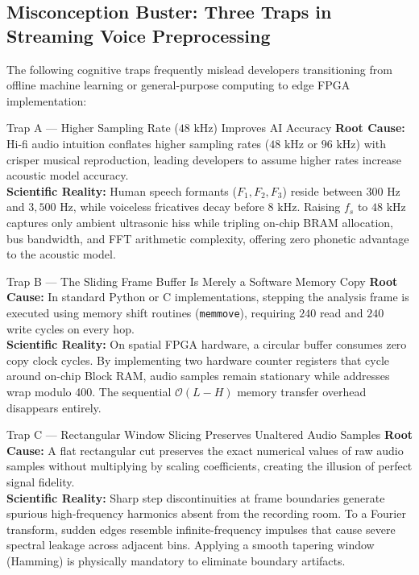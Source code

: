 \documentclass[11pt,a4paper]{article}
\begin{document}
\subsection*{Misconception Buster: Three Traps in Streaming Voice Preprocessing}

The following cognitive traps frequently mislead developers transitioning from offline machine learning or general-purpose computing to edge FPGA implementation:

\begin{misconceptionbox}{Trap A --- Higher Sampling Rate ($48\text{ kHz}$) Improves AI Accuracy}
\textbf{Root Cause:} Hi-fi audio intuition conflates higher sampling rates ($48\text{ kHz}$ or $96\text{ kHz}$) with crisper musical reproduction, leading developers to assume higher rates increase acoustic model accuracy.\\[1mm]
\textbf{Scientific Reality:} Human speech formants ($F_1, F_2, F_3$) reside between $300\text{ Hz}$ and $3{,}500\text{ Hz}$, while voiceless fricatives decay before $8\text{ kHz}$. Raising $f_s$ to $48\text{ kHz}$ captures only ambient ultrasonic hiss while tripling on-chip BRAM allocation, bus bandwidth, and FFT arithmetic complexity, offering zero phonetic advantage to the acoustic model.
\end{misconceptionbox}

\begin{misconceptionbox}{Trap B --- The Sliding Frame Buffer Is Merely a Software Memory Copy}
\textbf{Root Cause:} In standard Python or C implementations, stepping the analysis frame is executed using memory shift routines (\texttt{memmove}), requiring $240$ read and $240$ write cycles on every hop.\\[1mm]
\textbf{Scientific Reality:} On spatial FPGA hardware, a circular buffer consumes zero copy clock cycles. By implementing two hardware counter registers that cycle around on-chip Block RAM, audio samples remain stationary while addresses wrap modulo 400. The sequential $\mathcal{O}(L-H)$ memory transfer overhead disappears entirely.
\end{misconceptionbox}

\begin{misconceptionbox}{Trap C --- Rectangular Window Slicing Preserves Unaltered Audio Samples}
\textbf{Root Cause:} A flat rectangular cut preserves the exact numerical values of raw audio samples without multiplying by scaling coefficients, creating the illusion of perfect signal fidelity.\\[1mm]
\textbf{Scientific Reality:} Sharp step discontinuities at frame boundaries generate spurious high-frequency harmonics absent from the recording room. To a Fourier transform, sudden edges resemble infinite-frequency impulses that cause severe spectral leakage across adjacent bins. Applying a smooth tapering window (Hamming) is physically mandatory to eliminate boundary artifacts.
\end{misconceptionbox}
\end{document}
